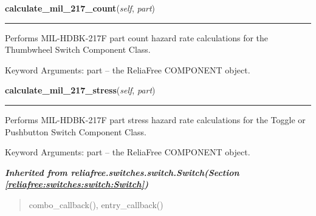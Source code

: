 \hspace{.8\funcindent}\begin{boxedminipage}{\funcwidth}

    \raggedright \textbf{calculate\_mil\_217\_count}(\textit{self}, \textit{part})

    \vspace{-1.5ex}

    \rule{\textwidth}{0.5\fboxrule}
\setlength{\parskip}{2ex}
    Performs MIL-HDBK-217F part count hazard rate calculations for the 
    Thumbwheel Switch Component Class.

    Keyword Arguments: part -- the ReliaFree COMPONENT object.

\setlength{\parskip}{1ex}
    \end{boxedminipage}

    \label{reliafree:switches:thumbwheel:Thumbwheel:calculate_mil_217_stress}

    \vspace{0.5ex}

\hspace{.8\funcindent}\begin{boxedminipage}{\funcwidth}

    \raggedright \textbf{calculate\_mil\_217\_stress}(\textit{self}, \textit{part})

    \vspace{-1.5ex}

    \rule{\textwidth}{0.5\fboxrule}
\setlength{\parskip}{2ex}
    Performs MIL-HDBK-217F part stress hazard rate calculations for the 
    Toggle or Pushbutton Switch Component Class.

    Keyword Arguments: part -- the ReliaFree COMPONENT object.

\setlength{\parskip}{1ex}
    \end{boxedminipage}


\large{\textbf{\textit{Inherited from reliafree.switches.switch.Switch\textit{(Section \ref{reliafree:switches:switch:Switch})}}}}

\begin{quote}
combo\_callback(), entry\_callback()
\end{quote}
